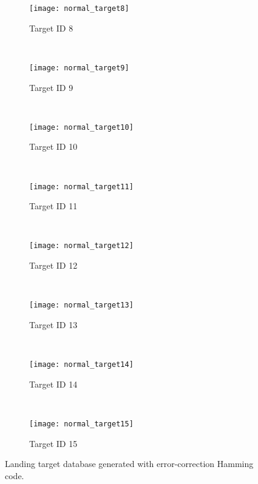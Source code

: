\begin{figure}[!ht]
	
    \begin{subfigure}[b]{0.23\textwidth}
		\centering
		\texttt{[image: normal\_target8]}	
		\caption{Target ID 8}
	\end{subfigure}
    ~ %
    \begin{subfigure}[b]{0.23\textwidth}
		\centering
		\texttt{[image: normal\_target9]}	
		\caption{Target ID 9}
	\end{subfigure}
	~ %
    \begin{subfigure}[b]{0.23\textwidth}
		\centering
		\texttt{[image: normal\_target10]}	
		\caption{Target ID 10}
	\end{subfigure}
	~ %
    \begin{subfigure}[b]{0.23\textwidth}
		\centering
		\texttt{[image: normal\_target11]}	
		\caption{Target ID 11}
	\end{subfigure} \\[2ex]    
    
    
    \begin{subfigure}[b]{0.23\textwidth}
		\centering
		\texttt{[image: normal\_target12]}	
		\caption{Target ID 12}
	\end{subfigure}
    ~ %
    \begin{subfigure}[b]{0.23\textwidth}
		\centering
		\texttt{[image: normal\_target13]}	
		\caption{Target ID 13}
	\end{subfigure} 
     ~ %
    \begin{subfigure}[b]{0.23\textwidth}
		\centering
		\texttt{[image: normal\_target14]}	
		\caption{Target ID 14}
	\end{subfigure}
	~ %
    \begin{subfigure}[b]{0.23\textwidth}
		\centering
		\texttt{[image: normal\_target15]}	
		\caption{Target ID 15}
	\end{subfigure}    
		
    \caption{Landing target database generated with error-correction Hamming code.}
    \label{fig:landing_target_database}
\end{figure}
